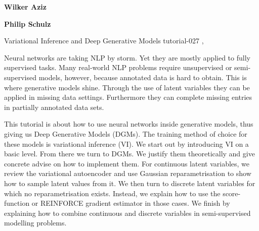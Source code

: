 \begin{bio}
{\bfseries Wilker Aziz} 

{\bfseries Philip Schulz}
\end{bio}

\begin{tutorial}
  {Variational Inference and Deep Generative Models}
  {tutorial-027}
  {\daydateyear, \tutorialmorningtime}
  {\TutLocC}

Neural networks are taking NLP by storm. Yet they are mostly applied to fully supervised tasks. Many real-world NLP problems require unsupervised or semi-supervised models, however, because annotated data is hard to obtain. This is where generative models shine. Through the use of latent variables they can be applied in missing data settings. Furthermore they can complete missing entries in partially annotated data sets.

This tutorial is about how to use neural networks inside generative models, thus giving us Deep Generative Models (DGMs). The training method of choice for these models is variational inference (VI). We start out by introducing VI on a basic level. From there we turn to DGMs. We justify them theoretically and give concrete advise on how to implement them. For continuous latent variables, we review the variational autoencoder and use Gaussian reparametrisation to show how to sample latent values from it. We then turn to discrete latent variables for which no reparametrisation exists. Instead, we explain how to use the score-function or REINFORCE gradient estimator in those cases. We finish by explaining how to combine continuous and discrete variables in semi-supervised modelling problems.

\end{tutorial}
